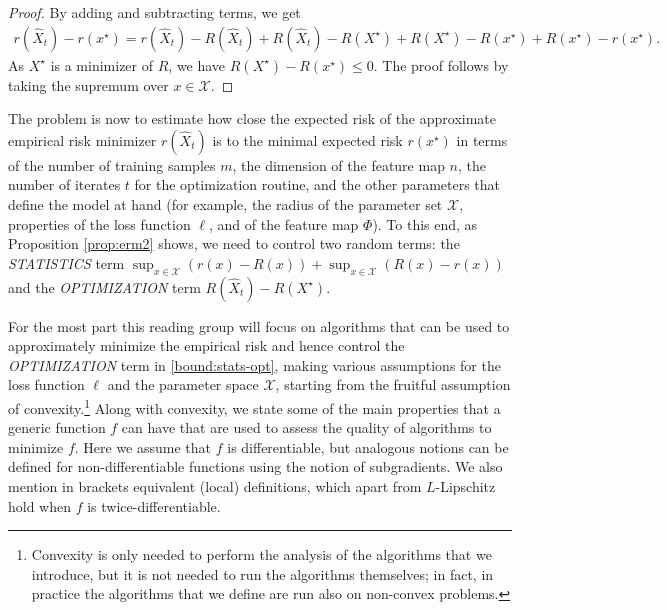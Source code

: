 \begin{proof}
By adding and subtracting terms, we get
\begin{align*}
	r(\hat X_t) - r(x^\star)
	= r(\hat X_t) - R(\hat X_t) + R(\hat X_t) - R(X^\star) + R(X^\star) - R(x^\star) + R(x^\star) - r(x^\star).
\end{align*}
As $X^\star$ is a minimizer of $R$, we have $R(X^\star) - R(x^\star) \le 0$. The proof follows by taking the supremum over $x\in\mathcal{X}$.
\end{proof}

The problem is now to estimate how close the expected risk of the approximate empirical risk minimizer $r(\hat X_t)$ is to the minimal expected risk $r(x^\star)$ in terms of the number of training samples $m$, the dimension of the feature map $n$, the number of iterates $t$ for the optimization routine, and the other parameters that define the model at hand (for example, the radius of the parameter set $\mathcal{X}$, properties of the loss function $\ell$, and of the feature map $\Phi$).
To this end, as Proposition \ref{prop:erm2} shows, we need to control two random terms: the \emph{STATISTICS} term $\sup_{x\in\mathcal{X}} ( r(x) - R(x) ) + \sup_{x\in\mathcal{X}} ( R(x) - r(x) )$ and the \emph{OPTIMIZATION} term $R(\hat X_t) - R(X^\star)$.

For the most part this reading group will focus on algorithms that can be used to approximately minimize the empirical risk and hence control the \emph{OPTIMIZATION} term in \eqref{bound:stats-opt}, making various assumptions for the loss function $\ell$ and the parameter space $\mathcal{X}$, starting from the fruitful assumption of convexity.\footnote{Convexity is only needed to perform the analysis of the algorithms that we introduce, but it is not needed to run the algorithms themselves; in fact, in practice the algorithms that we define are run also on non-convex problems.} Along with convexity, we state some of the main properties that a generic function $f$ can have that are used to assess the quality of algorithms to minimize $f$. Here we assume that $f$ is differentiable, but analogous notions can be defined for non-differentiable functions using the notion of subgradients. We also mention in brackets equivalent (local) definitions, which apart from $L$-Lipschitz hold when $f$ is twice-differentiable.

